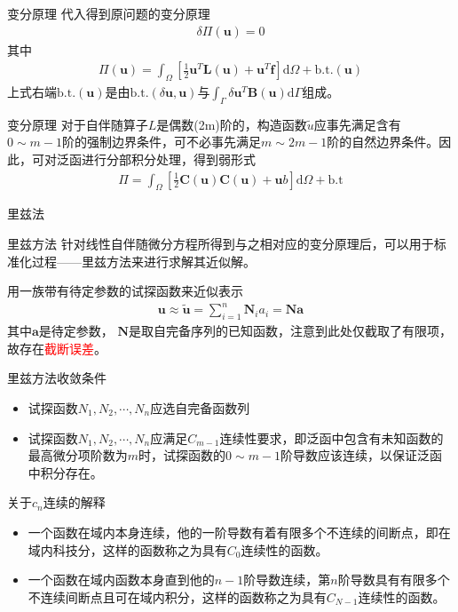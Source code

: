 \documentclass[11pt]{beamer}
\begin{document}
\begin{frame}{变分原理}
代入得到原问题的变分原理
\begin{align*}
\delta \Pi (\textbf{u})=0
\end{align*}
其中
\begin{align*}
\Pi(\textbf{u})=\int_{\Omega}\left[ \frac{1}{2}\textbf{u}^T \textbf{L}(\textbf{u})+\textbf{u}^T\textbf{f}\right] \mathrm{d}\Omega + \mathrm{b.t.}(\textbf{u})
\end{align*}
上式右端$\mathrm{b.t.}(\textbf{u})$是由$\mathrm{b.t.}(\delta \textbf{u},\textbf{u})$与$\int_\Gamma \delta{\textbf{u}}^T\textbf{B}(\textbf{u})\mathrm{d}\Gamma$组成。
\end{frame}


\begin{frame}{变分原理}
对于自伴随算子$L$是偶数(2m)阶的，构造函数$\tilde{u}$应事先满足含有$0\sim m-1$阶的强制边界条件，可不必事先满足$m\sim 2m-1$阶的自然边界条件。因此，可对泛函进行分部积分处理，得到弱形式
\begin{align*}
\Pi = \int_\Omega\left[\frac{1}{2}\textbf{C}(\textbf{u})\textbf{C}(\textbf{u})+\textbf{u} b\right] \mathrm{d}\Omega +\mathrm{b.t}
\end{align*}
\end{frame}

\begin{frame}{里兹法}
\begin{block}{里兹方法}
针对线性自伴随微分方程所得到与之相对应的变分原理后，可以用于标准化过程——里兹方法来进行求解其近似解。
\end{block}
用一族带有待定参数的试探函数来近似表示
\begin{align*}
\textbf{u} \approx \tilde{\textbf{u}}= \sum\limits_{i=1}^{n}\textbf{N}_i a_i=\textbf{N}\textbf{a}
\end{align*}
其中$\textbf{a}$是待定参数， $\textbf{N}$是取自完备序列的已知函数，注意到此处仅截取了有限项，故存在\textcolor{red}{截断误差}。
\end{frame}

\begin{frame}{里兹方法收敛条件}
\begin{itemize}
\item 试探函数$N_1,N_2,\cdots,N_n$应选自完备函数列
\item 试探函数$N_1,N_2,\cdots,N_n$应满足$C_{m-1}$连续性要求，即泛函中包含有未知函数的最高微分项阶数为$m$时，试探函数的$0\sim m-1$阶导数应该连续，以保证泛函中积分存在。
\end{itemize}
\begin{block}{关于$c_n$连续的解释}
\begin{itemize}
\item 一个函数在域内本身连续，他的一阶导数有着有限多个不连续的间断点，即在域内科技分，这样的函数称之为具有$C_0$连续性的函数。
\item 一个函数在域内函数本身直到他的$n-1$阶导数连续，第$n$阶导数具有有限多个不连续间断点且可在域内积分，这样的函数称之为具有$C_{N-1}$连续性的函数。
\end{itemize}
\end{block}
\end{frame}
\end{document}
